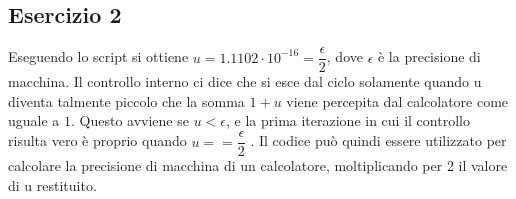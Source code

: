 \subsection{Esercizio 2}
Eseguendo lo script si ottiene $u = 1.1102 \cdot 10^{-16} = \dfrac{\epsilon}{2}$, dove $\epsilon$ è la precisione di macchina.
Il controllo interno ci dice che si esce dal ciclo solamente quando u diventa talmente piccolo che la somma $1+u$ viene percepita dal calcolatore come uguale a $1$.
Questo avviene se $ \displaystyle  u < \epsilon$, e la prima iterazione in cui il controllo risulta vero è proprio quando $ u == \dfrac{\epsilon}{2}$ . Il codice può quindi essere
utilizzato per calcolare la precisione di macchina di un calcolatore, moltiplicando per 2 il valore di u restituito. 